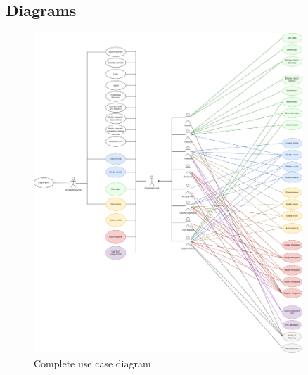 \newpage
\subsection{Diagrams}
\begin{figure}[H]
	\centering
	\includegraphics[width=0.9\textwidth]{images/usecase-diagram.png}
	\caption{Complete use case diagram}
	\label{fig:usecase-diagram}
\end{figure}

\newpage

